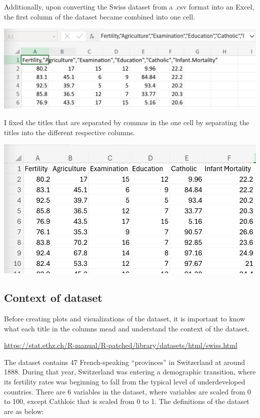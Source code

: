 \documentclass[
  letterpaper,
  DIV=11,
  numbers=noendperiod]{scrreprt}
\begin{document}
Additionally, upon converting the Swiss dataset from a .csv format into
an Excel, the first column of the dataset became combined into one cell.

\includegraphics{./Excel_1_Unit/Week1_Janice/Week 1/Week 1 Wednesday/Swiss_cleaning.png}

I fixed the titles that are separated by commas in the one cell by
separating the titles into the different respective columns.

\includegraphics{./Excel_1_Unit/Week1_Janice/Week 1/Week 1 Wednesday/Swiss_cleaning2.png}

\subsection{Context of dataset}\label{context-of-dataset}

Before creating plots and visualizations of the dataset, it is important
to know what each title in the columns mead and understand the context
of the dataset.

\url{https://stat.ethz.ch/R-manual/R-patched/library/datasets/html/swiss.html}

The dataset contains 47 French-speaking ``provinces'' in Switzerland at
around 1888. During that year, Switzerland was entering a demographic
transition, where its fertility rates was beginning to fall from the
typical level of underdeveloped countries. There are 6 variables in the
dataset, where variables are scaled from 0 to 100, except Cathloic that
is scaled from 0 to 1. The definitions of the dataset are as below:
\end{document}
